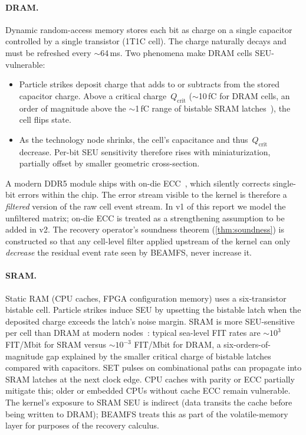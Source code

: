 \paragraph{DRAM.}
Dynamic random-access memory stores each bit as charge on a single
capacitor controlled by a single transistor (1T1C cell). The charge
naturally decays and must be refreshed every \(\sim\)64\,ms. Two
phenomena make DRAM cells SEU-vulnerable:
\begin{itemize}
\item Particle strikes deposit charge that adds to or subtracts from
  the stored capacitor charge. Above a critical
  charge~\(Q_{\text{crit}}\) (\(\sim\)10\,fC for DRAM cells, an
  order of magnitude above the \(\sim\)1\,fC range of bistable SRAM
  latches~\cite{baumann2005}), the cell flips state.
\item As the technology node shrinks, the cell's capacitance and
  thus~\(Q_{\text{crit}}\) decrease. Per-bit SEU sensitivity therefore
  rises with miniaturization, partially offset by smaller geometric
  cross-section.
\end{itemize}

A modern DDR5 module ships with on-die ECC~\cite{jedec79-5}, which
silently corrects single-bit errors within the chip. The error
stream visible to the kernel is therefore a \emph{filtered} version
of the raw cell event stream. In v1 of this report we model the
unfiltered matrix; on-die ECC is treated as a strengthening assumption
to be added in v2. The recovery operator's soundness
theorem (\cref{thm:soundness}) is constructed so that any cell-level
filter applied upstream of the kernel can only \emph{decrease} the
residual event rate seen by BEAMFS, never increase it.

\paragraph{SRAM.}
Static RAM (CPU caches, FPGA configuration memory) uses a six-transistor
bistable cell. Particle strikes induce SEU by upsetting the bistable
latch when the deposited charge exceeds the latch's noise margin.
SRAM is more SEU-sensitive per cell than DRAM at modern
nodes~\cite{dodd2003,baumann2005}: typical sea-level FIT rates are
\(\sim 10^{3}\) FIT/Mbit for SRAM versus \(\sim 10^{-3}\) FIT/Mbit
for DRAM, a six-orders-of-magnitude gap explained by the smaller
critical charge of bistable latches compared with capacitors.
SET pulses on combinational paths can propagate into SRAM latches
at the next clock edge. CPU caches with parity or ECC partially
mitigate this; older or embedded CPUs without cache ECC remain
vulnerable. The kernel's exposure to SRAM SEU is indirect (data
transits the cache before being written to DRAM); BEAMFS treats
this as part of the volatile-memory layer for purposes of the
recovery calculus.

